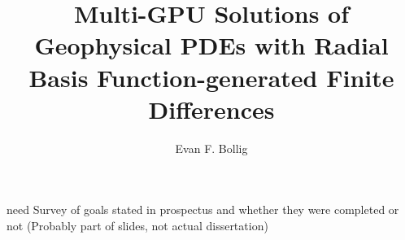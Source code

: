 \documentclass[11pt]{fsuthesis}
\title{Multi-GPU Solutions of Geophysical PDEs with Radial Basis Function-generated Finite Differences}
\author{Evan F. Bollig}
\begin{document}
	\frontmatter
	\maketitle
	\makecommitteepage
	
	
	\tableofcontents
	\listoftables
	\listoffigures
	\listofalgorithms
	
	
	

\mainmatter




 
 
 



need Survey of goals stated in prospectus and whether they were completed or not (Probably part of slides, not actual dissertation)
\end{document}
